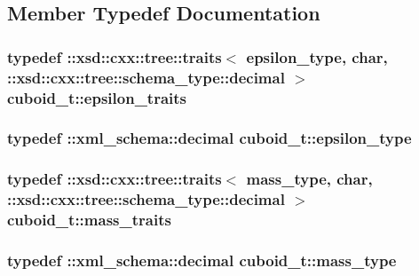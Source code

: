 \subsection{Member Typedef Documentation}
\hypertarget{classcuboid__t_a909ff9ef57adeb2edaa27cda6e531c44}{
\subsubsection[{epsilon\-\_\-traits}]{\setlength{\rightskip}{0pt plus 5cm}typedef \-::xsd\-::cxx\-::tree\-::traits$<$ {\bf epsilon\-\_\-type}, char, \-::xsd\-::cxx\-::tree\-::schema\-\_\-type\-::decimal $>$ {\bf cuboid\-\_\-t\-::epsilon\-\_\-traits}}}\label{classcuboid__t_a909ff9ef57adeb2edaa27cda6e531c44}
\hypertarget{classcuboid__t_ac4a981a7963b1b2105d448cf42ab1230}{
\subsubsection[{epsilon\-\_\-type}]{\setlength{\rightskip}{0pt plus 5cm}typedef \-::{\bf xml\-\_\-schema\-::decimal} {\bf cuboid\-\_\-t\-::epsilon\-\_\-type}}}\label{classcuboid__t_ac4a981a7963b1b2105d448cf42ab1230}
\hypertarget{classcuboid__t_a3414ba3ff63f2e3abac4ec2f5ff7932d}{
\subsubsection[{mass\-\_\-traits}]{\setlength{\rightskip}{0pt plus 5cm}typedef \-::xsd\-::cxx\-::tree\-::traits$<$ {\bf mass\-\_\-type}, char, \-::xsd\-::cxx\-::tree\-::schema\-\_\-type\-::decimal $>$ {\bf cuboid\-\_\-t\-::mass\-\_\-traits}}}\label{classcuboid__t_a3414ba3ff63f2e3abac4ec2f5ff7932d}
\hypertarget{classcuboid__t_a365536fb1db29c6ef0da234297763d61}{
\subsubsection[{mass\-\_\-type}]{\setlength{\rightskip}{0pt plus 5cm}typedef \-::{\bf xml\-\_\-schema\-::decimal} {\bf cuboid\-\_\-t\-::mass\-\_\-type}}}\label{classcuboid__t_a365536fb1db29c6ef0da234297763d61}
